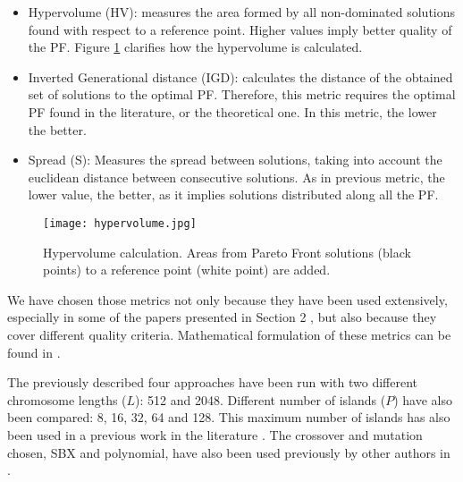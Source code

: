 \documentclass[preprint]{elsarticle}
\begin{document}
\begin{itemize}
\item Hypervolume (HV): measures the area formed by all non-dominated solutions found with respect to a reference point. Higher values imply better quality of the PF. Figure \ref{fig:hypervolume} clarifies how the hypervolume is calculated.
\item Inverted Generational distance (IGD): calculates the distance of the obtained set of solutions to the optimal PF. Therefore, this metric requires the optimal PF found in the literature, or the theoretical one. In this metric, the lower the better. %
\item Spread (S): Measures the spread between solutions, taking into account the euclidean distance between consecutive solutions. As in previous metric, the lower value, the better, as it implies solutions distributed along all the PF.
\end{itemize}

\begin{figure}
\centering
\texttt{[image: hypervolume.jpg]}
\caption{Hypervolume calculation. Areas from Pareto Front solutions (black points) to a reference point (white point) are added.}
\label{fig:hypervolume}
\end{figure}


We have chosen those metrics not only because they have been used extensively, especially in some of the papers presented in Section 2 \cite{Dorronsoro13superlinear,Durillo08masterslave,Hiroyasu07discussion,Wang09parallel,Martens13asynchronous}, but also because they cover different quality criteria. Mathematical formulation of these metrics can be found in \cite{Dorronsoro13superlinear}.



The previously described four approaches have been run with two
different chromosome lengths ($L$): 512 and 2048. Different number of
islands ($P$) have also been compared: 8, 16, 32, 64 and 128. This
maximum number of islands has also been  used in a previous work in the
literature \citep{Martens13asynchronous}. The crossover and mutation
chosen, SBX and polynomial, have also been  used previously by other
authors in \citep{Durillo08masterslave}.  %
\end{document}
